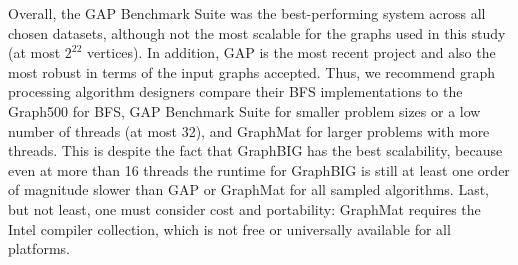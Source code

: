 \documentclass[conference]{IEEEtran}
\begin{document}
Overall, the GAP Benchmark Suite was the best-performing system across all chosen datasets, although not the most scalable for the graphs used in this study (at most $2^{22}$ vertices). In addition, GAP is the most recent project and also the most robust in terms of the input graphs accepted. Thus, we recommend graph processing algorithm designers compare their BFS implementations to the Graph500 for BFS, GAP Benchmark Suite for smaller problem sizes or a low number of threads (at most 32), and GraphMat for larger problems with more threads. This is despite the fact that GraphBIG has the best scalability, because even at more than 16 threads the runtime for GraphBIG is still at least one order of magnitude slower than GAP or GraphMat for all sampled algorithms. Last, but not least, one must consider cost and portability: GraphMat requires the Intel compiler collection, which is not free or universally available for all platforms.



\end{document}
